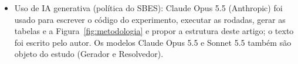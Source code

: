 \documentclass[sigconf]{acmart}
\newcommand{\topicos}[1]{{\color{gray}\begin{itemize}\setlength\itemsep{0pt}#1\end{itemize}}}
\begin{document}
\begin{acks}
\topicos{
\item Uso de IA generativa (política do SBES): Claude Opus 5.5 (Anthropic) foi usado para escrever o código do experimento, executar as rodadas, gerar as tabelas e a Figura~\ref{fig:metodologia} e propor a estrutura deste artigo; o texto foi escrito pelo autor. Os modelos Claude Opus 5.5 e Sonnet 5.5 também são objeto do estudo (Gerador e Resolvedor).
}
\end{acks}



\end{document}
